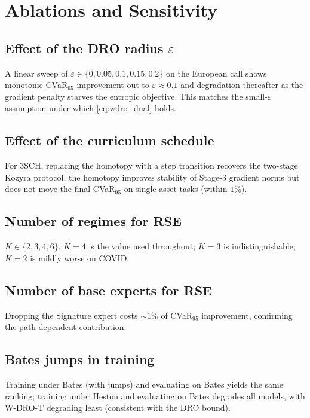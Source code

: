 \documentclass[11pt,a4paper]{article}
\begin{document}
\section{Ablations and Sensitivity}\label{sec:ablation}

\subsection{Effect of the DRO radius $\varepsilon$}
A linear sweep of $\varepsilon\in\{0,0.05,0.1,0.15,0.2\}$ on the European
call shows monotonic CVaR$_{95}$ improvement out to $\varepsilon\!\approx\!0.1$
and degradation thereafter as the gradient penalty starves the entropic
objective.  This matches the small-$\varepsilon$ assumption under which
\eqref{eq:wdro_dual} holds.

\subsection{Effect of the curriculum schedule}
For 3SCH, replacing the homotopy with a step transition recovers
the two-stage Kozyra protocol; the homotopy improves stability of Stage-3
gradient norms but does not move the final CVaR$_{95}$ on single-asset
tasks (within $1\%$).

\subsection{Number of regimes for RSE}
$K\in\{2,3,4,6\}$.  $K=4$ is the value used throughout; $K=3$ is
indistinguishable; $K=2$ is mildly worse on COVID.

\subsection{Number of base experts for RSE}
Dropping the Signature expert costs $\sim$$1\%$ of CVaR$_{95}$ improvement,
confirming the path-dependent contribution.

\subsection{Bates jumps in training}
Training under Bates (with jumps) and evaluating on Bates yields the same
ranking; training under Heston and evaluating on Bates degrades all
models, with W-DRO-T degrading least (consistent with the DRO bound).

\end{document}
